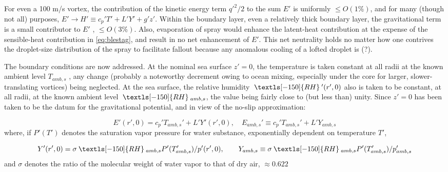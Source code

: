 \documentclass[preprint, prX]{revtex4}
\newcommand{\rh}{\:\textls[-150]{RH}\:}
\begin{document}
For even a 100 m/s vortex, the contribution of the kinetic energy term $q'^2 /2$ to the sum $E'$ is uniformly $\leq O(1 \%)$, and for many (though not all) purposes, $E' \rightarrow H' \equiv c_p' T'+L' Y' +g' z'$. Within the boundary layer, even a relatively thick boundary layer, the gravitational term is a small contributor to $E'$ , $\leq O(3 \%)$. Also, evaporation of spray would enhance the latent-heat contribution at the expense of the sensible-heat contribution in \eqref{eq:blestag}, and result in no net enhancement of $E'$. This net neutrality holds no matter how one contrives the droplet-size distribution of the spray to facilitate fallout because any anomalous cooling of a lofted droplet is (?). 

The boundary conditions are now addressed. At the nominal sea surface $z'=0$, the temperature is taken constant at all radii at the known ambient level $T_{amb,s}$ , any change (probably a noteworthy decrement owing to ocean mixing, especially under the core for larger, slower-translating vortices) being neglected. At the sea surface, the relative humidity $\rh'(r', 0)$ also is taken to be constant, at all radii, at the known  ambient level $\rh_{amb,s}$, the value being fairly close to (but less than) unity. Since $z'=0$ has been taken to be the datum for the gravitational potential, and in view of the no-slip approximation:

\begin{equation}
E'(r',0) = c_p' T_{amb,s}' + L' Y'(r',0), \quad E_{amb,s}' \equiv c_p'T_{amb,s}' + L' Y_{amb,s}
\end{equation}
where, if $P'(T')$ denotes the saturation vapor pressure for water substance, exponentially dependent on temperature $T'$,

\begin{equation}
Y'(r',0) = \sigma \rh_{amb,s} P'(T_{amb,s}')/p'(r',0), \qquad Y_{amb,s}\equiv \sigma \rh_{amb,s}P'(T_{amb,s}')/p_{amb,s}'
\end{equation}
and $\sigma$ denotes the ratio of the molecular weight of water vapor to that of dry air, $\approx 0.622$
\end{document}
